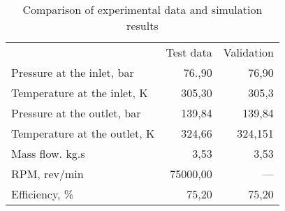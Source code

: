 \begin{table}
\label{tab:Comparison}
\caption{Comparison of experimental data and simulation results}
\begin{center}
\begin{tabulary}{0.9\textwidth}{LRR}

	&	Test data \cite{Rinaldi_2013}	&	Validation	\\
Pressure at the inlet, bar	&	76.,90	&	76,90	\\
Temperature at the inlet, K	&	305,30	&	305,3	\\
Pressure at the outlet, bar	&	139,84	&	139,84	\\
Temperature at the outlet, K	&	324,66	&	324,151	\\
Mass flow. kg.s	&	3,53	&	3,53	\\
RPM, rev/min	&	75000,00	&	—	\\
Efficiency, \%	&	75,20	&	75,20	\\

\end{tabulary}
\end{center}
\end{table}